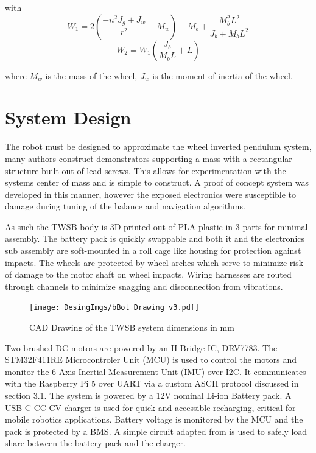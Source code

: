     with 
    \[
    W_1 = 2\left(\frac{-n^2 J_g + J_w }{r^2 } - M_w \right) - M_b + \frac{M_b^2 L^2 }{J_b + M_b L^2 }
    \]
    \[
    W_2 = W_1 \left(\frac{J_b }{M_b L} + L\right)
    \]

    where $M_w$ is the mass of the wheel, $J_w$ is the moment of inertia of the wheel.
    \pagebreak{}

    \section{System Design}
        The robot must be designed to approximate the wheel inverted pendulum system, many authors 
        construct demonstrators supporting a mass with a rectangular structure built out of lead screws. 
        This allows for experimentation with the systems center of mass and is simple to construct. 
        A proof of concept system was developed in this manner, however the exposed electronics were 
        susceptible to damage during tuning of the balance and navigation algorithms.

        As such the TWSB body is 3D printed out of PLA plastic in 3 parts for minimal assembly.
        The battery pack is quickly swappable and both it and the electronics sub assembly 
        are soft-mounted in a roll cage like housing for protection against impacts. 
        The wheels are protected by wheel arches which serve to minimize risk of damage to the motor shaft on wheel impacts. 
        Wiring harnesses are routed through channels to minimize snagging and disconnection from vibrations.
        
        \begin{figure}[H]
            \texttt{[image: DesingImgs/bBot Drawing v3.pdf]}
            \caption{CAD Drawing of the TWSB system dimensions in mm}
            \label{fig:CAD}
        \end{figure}

        Two brushed DC motors are powered by an H-Bridge IC, DRV7783. 
        The STM32F411RE Microcontroler Unit (MCU) is used to control the 
        motors and monitor the 6 Axis Inertial Measurement Unit (IMU) over I2C. It communicates with the 
        Raspberry Pi 5 over UART via a custom ASCII protocol discussed in section 3.1. 
        The system is powered by a 12V nominal Li-ion Battery pack. A USB-C CC-CV charger is used for quick 
        and accessible recharging, critical for mobile robotics applications. 
        Battery voltage is monitored by the MCU and the pack is protected by a BMS.
        A simple circuit adapted from \cite{chu2008designing} is used to safely load share between the battery pack and the charger.

